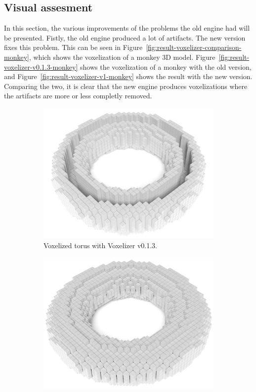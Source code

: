 \subsection{Visual assesment}
In this section, the various improvements of the problems the old engine had will be presented. Fistly, the old engine produced a lot of artifacts. The new version fixes this problem. This can be seen in Figure~\ref{fig:result-voxelizer-comparison-monkey}, which shows the voxelization of a monkey 3D model. Figure~\ref{fig:result-voxelizer-v0.1.3-monkey} shows the voxelization of a monkey with the old version, and Figure~\ref{fig:result-voxelizer-v1-monkey} shows the result with the new version. Comparing the two, it is clear that the new engine produces voxelizations where the artifacts are more or less completly removed.
\begin{figure}[htp]
    \centering
    \begin{subfigure}[b]{0.49\textwidth}
        \centering
        \includegraphics[width=\textwidth]{sections/theory/figures/voxelizer-v013-torus-40.png}
        \caption{Voxelized torus with Voxelizer v0.1.3.}
        \label{fig:result-voxelizer-v0.1.3-torus}
    \end{subfigure}
    \hfill
    \begin{subfigure}[b]{0.49\textwidth}
        \centering
        \includegraphics[width=\textwidth]{sections/result/figures/torus-voxelized-v1-40.png}

\end{subfigure}
\end{figure}
